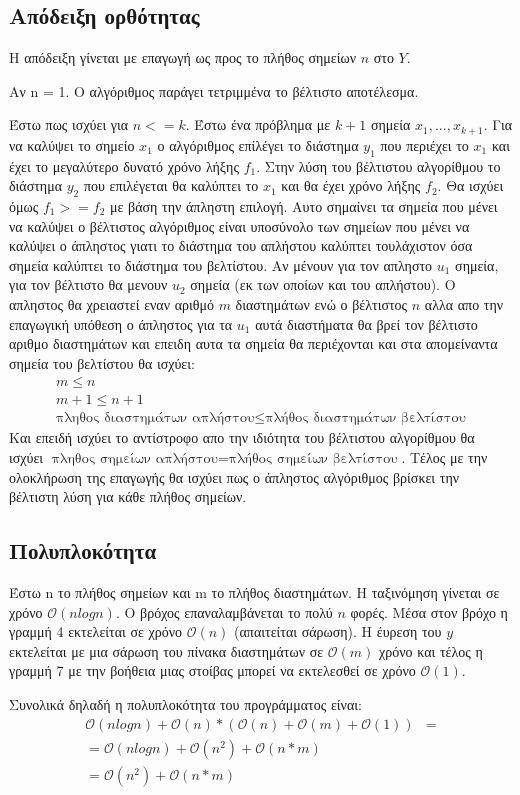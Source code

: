 \documentclass{article}
\renewcommand{\O}{\mathcal{O}}
\begin{document}
\subsection{Απόδειξη ορθότητας}
Η απόδειξη γίνεται με επαγωγή ως προς το πλήθος σημείων $n$ στο $Y$.

Αν n = 1. Ο αλγόριθμος παράγει τετριμμένα το βέλτιστο αποτέλεσμα.

Έστω πως ισχύει για $n <= k$. Έστω ένα πρόβλημα με $k+1$ σημεία $x_1,...,x_{k+1}$. Για να καλύψει το σημείο $x_1$ ο αλγόριθμος επίλέγει το διάστημα $y_1$ που περιέχει το
$x_1$ και έχει το μεγαλύτερο δυνατό χρόνο λήξης $f_1$. Στην λύση του βέλτιστου αλγορίθμου το διάστημα $y_2$ που επιλέγεται θα καλύπτει το $x_1$ και θα έχει χρόνο λήξης $f_2$.
Θα ισχύει όμως $f_1 >= f_2$ με βάση την άπληστη επιλογή. Αυτο σημαίνει τα σημεία που μένει να καλύψει ο βέλτιστος αλγόριθμος είναι υποσύνολο των σημείων που μένει να καλύψει
ο άπληστος γιατι το διάστημα του απλήστου καλύπτει τουλάχιστον όσα σημεία καλύπτει το διάστημα του βελτίστου. Αν μένουν για τον απληστο $u_1$ σημεία, για τον
βέλτιστο θα μενουν $u_2$ σημεία (εκ των οποίων και του απλήστου). Ο απληστος θα χρειαστεί εναν αριθμό $m$ διαστημάτων ενώ ο βέλτιστος $n$ αλλα απο την επαγωγική υπόθεση ο άπληστος
για τα $u_1$ αυτά διαστήματα θα βρεί τον βέλτιστο αριθμο διαστημάτων και επειδη αυτα τα σημεία θα περιέχονται και στα απομείναντα σημεία του βελτίστου θα ισχύει:
\begin{eqnarray}
	m \leq n \\
	 m +1 \leq n +1 \\
	\text{πληθος διαστημάτων απλήστου} \leq \text{πλήθος διαστημάτων βελτίστου}
\end{eqnarray}
Και επειδή ισχύει το αντίστροφο απο την ιδιότητα του βέλτιστου αλγορίθμου θα ισχύει $ \text{πληθος σημείων απλήστου} = \text{πλήθος σημείων βελτίστου}$.
Τέλος με την ολοκλήρωση της επαγωγής θα ισχύει πως ο άπληστος αλγόριθμος βρίσκει την βέλτιστη λύση για κάθε πλήθος σημείων.
\subsection{Πολυπλοκότητα}
Έστω n το πλήθος σημείων και m το πλήθος διαστημάτων.
Η ταξινόμηση γίνεται σε χρόνο $\O(nlogn)$. Ο βρόχος επαναλαμβάνεται το πολύ $ n $
φορές. Μέσα στον βρόχο η γραμμή 4 εκτελείται σε χρόνο $\O(n)$ (απαιτείται σάρωση). Η έυρεση
του $y$ εκτελείται με μια σάρωση του πίνακα διαστημάτων σε $\O(m)$ χρόνο και τέλος η γραμμή 7 με την
βοήθεια μιας στοίβας μπορεί να εκτελεσθεί σε χρόνο $\O(1)$.

Συνολικά δηλαδή η πολυπλοκότητα του προγράμματος είναι:
\begin{align}
	\O(nlogn) + \O(n) * (\O(n) + \O(m) + \O(1)) &=\\
	=\O(nlogn) + \O(n^2) + \O(n*m) \\
	=\O(n^2) + \O(n*m)
\end{align}
	
\end{document}
